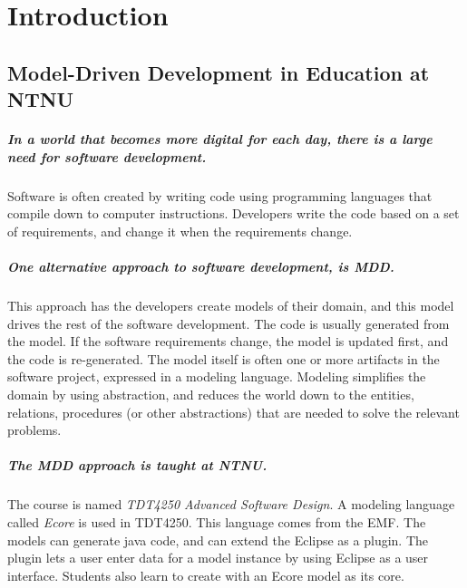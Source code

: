 \chapter{Introduction}\label{chap:introduction}

\section{Model-Driven Development in Education at NTNU}

\paragraph{In a world that becomes more digital for each day, there is a large need for software development.} Software is often created by writing code using programming languages that compile down to computer instructions. Developers write the code based on a set of requirements, and change it when the  requirements change.

\paragraph{One alternative approach to software development, is \acrfull{MDD}.}
This approach has the developers create models of their \gls{domain}, and this model drives the rest of the software development. 
The code is usually generated from the model. 
If the software requirements change, the model is updated first, and the code is re-generated.
The model itself is often one or more artifacts in the software project, expressed in a modeling language.
Modeling simplifies the \gls{domain} by using abstraction, and reduces the world down to the entities, relations, procedures (or other abstractions) that are needed to solve the relevant problems.


\paragraph{The \acrshort{MDD} approach is taught at \acrfull{NTNU}.}
The course is named \textit{\gls{TDT4250} Advanced Software Design}.
A modeling language called \textit{\gls{Ecore}} is used in \gls{TDT4250}.
This language comes from the \acrfull{EMF}.
The models can generate java code, and can extend the \gls{Eclipse} as a plugin.
The plugin lets a user enter data for a model instance by using \gls{Eclipse} as a user interface.
Students also learn to create  with an \gls{Ecore} model as its core.

